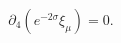 \begin{equation}\label{remgaugetr}
\partial_{4}\left(e^{-2\sigma}\xi_{\mu}\right)=0.
\end{equation}


